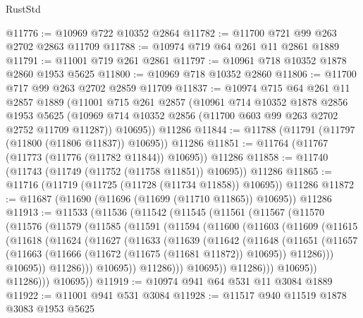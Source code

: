 \begin{lexlean}{RustStd}
\begin{coremodule}
@11776 := @10969 @722 @10352 @2864
@11782 := @11700 @721 @99 @263 @2702 @2863 @11709
@11788 := @10974 @719 @64 @261 @11 @2861 @1889
@11791 := @11001 @719 @261 @2861
@11797 := @10961 @718 @10352 @1878 @2860 @1953 @5625
@11800 := @10969 @718 @10352 @2860
@11806 := @11700 @717 @99 @263 @2702 @2859 @11709
@11837 := @10974
    @715
    @64
    @261
    @11
    @2857
    @1889
    (@11001
      @715
      @261
      @2857
      (@10961
        @714
        @10352
        @1878
        @2856
        @1953
        @5625
        (@10969 @714 @10352 @2856 (@11700 @603 @99 @263 @2702 @2752 @11709 @11287))
        @10695))
    @11286
@11844 := @11788 (@11791 (@11797 (@11800 (@11806 @11837)) @10695)) @11286
@11851 := @11764 (@11767 (@11773 (@11776 (@11782 @11844)) @10695)) @11286
@11858 := @11740 (@11743 (@11749 (@11752 (@11758 @11851)) @10695)) @11286
@11865 := @11716 (@11719 (@11725 (@11728 (@11734 @11858)) @10695)) @11286
@11872 := @11687 (@11690 (@11696 (@11699 (@11710 @11865)) @10695)) @11286
@11913 := @11533
    (@11536
      (@11542
        (@11545
          (@11561
            (@11567
              (@11570
                (@11576
                  (@11579
                    (@11585
                      (@11591
                        (@11594
                          (@11600
                            (@11603
                              (@11609
                                (@11615
                                  (@11618
                                    (@11624
                                      (@11627
                                        (@11633
                                          (@11639
                                            (@11642
                                              (@11648
                                                (@11651
                                                  (@11657
                                                    (@11663
                                                      (@11666
                                                        (@11672 (@11675 (@11681 @11872)) @10695))
                                                      @11286)))
                                                @10695))
                                            @11286)))
                                      @10695))
                                  @11286)))
                            @10695))
                        @11286)))
                  @10695))
              @11286)))
        @10695))
@11919 := @10974 @941 @64 @531 @11 @3084 @1889
@11922 := @11001 @941 @531 @3084
@11928 := @11517 @940 @11519 @1878 @3083 @1953 @5625

\end{coremodule}
\end{lexlean}
